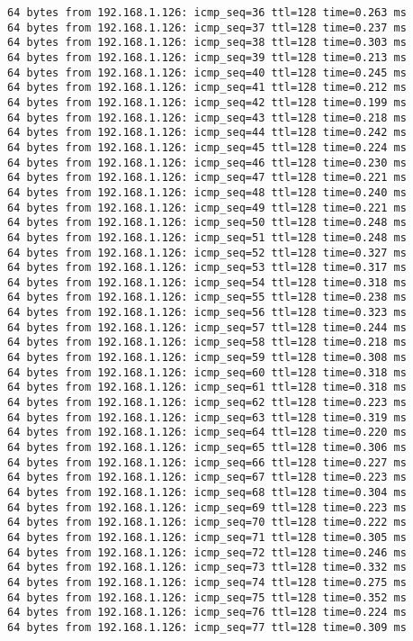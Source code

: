 \begin{lstlisting}[frame=single, caption={The Ping test without OVS}, label={lst:Pingtest_no_OVS}]
64 bytes from 192.168.1.126: icmp_seq=36 ttl=128 time=0.263 ms
64 bytes from 192.168.1.126: icmp_seq=37 ttl=128 time=0.237 ms
64 bytes from 192.168.1.126: icmp_seq=38 ttl=128 time=0.303 ms
64 bytes from 192.168.1.126: icmp_seq=39 ttl=128 time=0.213 ms
64 bytes from 192.168.1.126: icmp_seq=40 ttl=128 time=0.245 ms
64 bytes from 192.168.1.126: icmp_seq=41 ttl=128 time=0.212 ms
64 bytes from 192.168.1.126: icmp_seq=42 ttl=128 time=0.199 ms
64 bytes from 192.168.1.126: icmp_seq=43 ttl=128 time=0.218 ms
64 bytes from 192.168.1.126: icmp_seq=44 ttl=128 time=0.242 ms
64 bytes from 192.168.1.126: icmp_seq=45 ttl=128 time=0.224 ms
64 bytes from 192.168.1.126: icmp_seq=46 ttl=128 time=0.230 ms
64 bytes from 192.168.1.126: icmp_seq=47 ttl=128 time=0.221 ms
64 bytes from 192.168.1.126: icmp_seq=48 ttl=128 time=0.240 ms
64 bytes from 192.168.1.126: icmp_seq=49 ttl=128 time=0.221 ms
64 bytes from 192.168.1.126: icmp_seq=50 ttl=128 time=0.248 ms
64 bytes from 192.168.1.126: icmp_seq=51 ttl=128 time=0.248 ms
64 bytes from 192.168.1.126: icmp_seq=52 ttl=128 time=0.327 ms
64 bytes from 192.168.1.126: icmp_seq=53 ttl=128 time=0.317 ms
64 bytes from 192.168.1.126: icmp_seq=54 ttl=128 time=0.318 ms
64 bytes from 192.168.1.126: icmp_seq=55 ttl=128 time=0.238 ms
64 bytes from 192.168.1.126: icmp_seq=56 ttl=128 time=0.323 ms
64 bytes from 192.168.1.126: icmp_seq=57 ttl=128 time=0.244 ms
64 bytes from 192.168.1.126: icmp_seq=58 ttl=128 time=0.218 ms
64 bytes from 192.168.1.126: icmp_seq=59 ttl=128 time=0.308 ms
64 bytes from 192.168.1.126: icmp_seq=60 ttl=128 time=0.318 ms
64 bytes from 192.168.1.126: icmp_seq=61 ttl=128 time=0.318 ms
64 bytes from 192.168.1.126: icmp_seq=62 ttl=128 time=0.223 ms
64 bytes from 192.168.1.126: icmp_seq=63 ttl=128 time=0.319 ms
64 bytes from 192.168.1.126: icmp_seq=64 ttl=128 time=0.220 ms
64 bytes from 192.168.1.126: icmp_seq=65 ttl=128 time=0.306 ms
64 bytes from 192.168.1.126: icmp_seq=66 ttl=128 time=0.227 ms
64 bytes from 192.168.1.126: icmp_seq=67 ttl=128 time=0.223 ms
64 bytes from 192.168.1.126: icmp_seq=68 ttl=128 time=0.304 ms
64 bytes from 192.168.1.126: icmp_seq=69 ttl=128 time=0.223 ms
64 bytes from 192.168.1.126: icmp_seq=70 ttl=128 time=0.222 ms
64 bytes from 192.168.1.126: icmp_seq=71 ttl=128 time=0.305 ms
64 bytes from 192.168.1.126: icmp_seq=72 ttl=128 time=0.246 ms
64 bytes from 192.168.1.126: icmp_seq=73 ttl=128 time=0.332 ms
64 bytes from 192.168.1.126: icmp_seq=74 ttl=128 time=0.275 ms
64 bytes from 192.168.1.126: icmp_seq=75 ttl=128 time=0.352 ms
64 bytes from 192.168.1.126: icmp_seq=76 ttl=128 time=0.224 ms
64 bytes from 192.168.1.126: icmp_seq=77 ttl=128 time=0.309 ms

\end{lstlisting}
